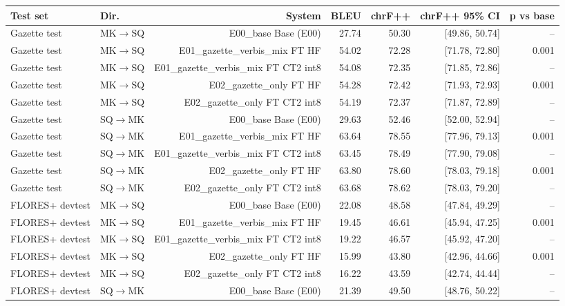 \begin{table}[t]
\centering
\small
\begin{tabular}{llrrrrr}
\toprule
Test set & Dir. & System & BLEU & chrF++ & chrF++ 95\% CI & p vs base \\
\midrule
Gazette test & MK$\rightarrow$SQ & E00\_base Base (E00) & 27.74 & 50.30 & [49.86, 50.74] & – \\
Gazette test & MK$\rightarrow$SQ & E01\_gazette\_verbis\_mix FT HF & 54.02 & 72.28 & [71.78, 72.80] & 0.001 \\
Gazette test & MK$\rightarrow$SQ & E01\_gazette\_verbis\_mix FT CT2 int8 & 54.08 & 72.35 & [71.85, 72.86] & – \\
Gazette test & MK$\rightarrow$SQ & E02\_gazette\_only FT HF & 54.28 & 72.42 & [71.93, 72.93] & 0.001 \\
Gazette test & MK$\rightarrow$SQ & E02\_gazette\_only FT CT2 int8 & 54.19 & 72.37 & [71.87, 72.89] & – \\
Gazette test & SQ$\rightarrow$MK & E00\_base Base (E00) & 29.63 & 52.46 & [52.00, 52.94] & – \\
Gazette test & SQ$\rightarrow$MK & E01\_gazette\_verbis\_mix FT HF & 63.64 & 78.55 & [77.96, 79.13] & 0.001 \\
Gazette test & SQ$\rightarrow$MK & E01\_gazette\_verbis\_mix FT CT2 int8 & 63.45 & 78.49 & [77.90, 79.08] & – \\
Gazette test & SQ$\rightarrow$MK & E02\_gazette\_only FT HF & 63.80 & 78.60 & [78.03, 79.18] & 0.001 \\
Gazette test & SQ$\rightarrow$MK & E02\_gazette\_only FT CT2 int8 & 63.68 & 78.62 & [78.03, 79.20] & – \\
FLORES+ devtest & MK$\rightarrow$SQ & E00\_base Base (E00) & 22.08 & 48.58 & [47.84, 49.29] & – \\
FLORES+ devtest & MK$\rightarrow$SQ & E01\_gazette\_verbis\_mix FT HF & 19.45 & 46.61 & [45.94, 47.25] & 0.001 \\
FLORES+ devtest & MK$\rightarrow$SQ & E01\_gazette\_verbis\_mix FT CT2 int8 & 19.22 & 46.57 & [45.92, 47.20] & – \\
FLORES+ devtest & MK$\rightarrow$SQ & E02\_gazette\_only FT HF & 15.99 & 43.80 & [42.96, 44.66] & 0.001 \\
FLORES+ devtest & MK$\rightarrow$SQ & E02\_gazette\_only FT CT2 int8 & 16.22 & 43.59 & [42.74, 44.44] & – \\
FLORES+ devtest & SQ$\rightarrow$MK & E00\_base Base (E00) & 21.39 & 49.50 & [48.76, 50.22] & – \\

\end{tabular}
\end{table}
